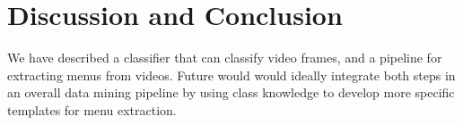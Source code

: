 \documentclass[10pt]{article}
\begin{document}
\section{Discussion and Conclusion}

We have described a classifier that can classify video frames, and a pipeline for extracting menus
from videos. Future would would ideally integrate both steps in an overall data mining pipeline by
using class knowledge to develop more specific templates for menu extraction.

\printbibliography
\end{document}
